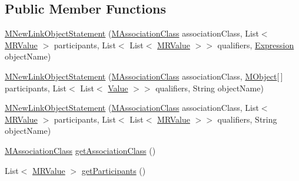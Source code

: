 \subsection*{Public Member Functions}
\begin{DoxyCompactItemize}
\item 
\hyperlink{classorg_1_1tzi_1_1use_1_1uml_1_1sys_1_1soil_1_1_m_new_link_object_statement_a0d26593ade840a62aec55f7de94e185e}{M\-New\-Link\-Object\-Statement} (\hyperlink{interfaceorg_1_1tzi_1_1use_1_1uml_1_1mm_1_1_m_association_class}{M\-Association\-Class} association\-Class, List$<$ \hyperlink{classorg_1_1tzi_1_1use_1_1uml_1_1sys_1_1soil_1_1_m_r_value}{M\-R\-Value} $>$ participants, List$<$ List$<$ \hyperlink{classorg_1_1tzi_1_1use_1_1uml_1_1sys_1_1soil_1_1_m_r_value}{M\-R\-Value} $>$$>$ qualifiers, \hyperlink{classorg_1_1tzi_1_1use_1_1uml_1_1ocl_1_1expr_1_1_expression}{Expression} object\-Name)
\item 
\hyperlink{classorg_1_1tzi_1_1use_1_1uml_1_1sys_1_1soil_1_1_m_new_link_object_statement_ab247cc575bdc80b9fc8e1a443c51d5c7}{M\-New\-Link\-Object\-Statement} (\hyperlink{interfaceorg_1_1tzi_1_1use_1_1uml_1_1mm_1_1_m_association_class}{M\-Association\-Class} association\-Class, \hyperlink{interfaceorg_1_1tzi_1_1use_1_1uml_1_1sys_1_1_m_object}{M\-Object}\mbox{[}$\,$\mbox{]} participants, List$<$ List$<$ \hyperlink{classorg_1_1tzi_1_1use_1_1uml_1_1ocl_1_1value_1_1_value}{Value} $>$$>$ qualifiers, String object\-Name)
\item 
\hyperlink{classorg_1_1tzi_1_1use_1_1uml_1_1sys_1_1soil_1_1_m_new_link_object_statement_a5bb6b98ba0089b52077ddb3b8aac15fc}{M\-New\-Link\-Object\-Statement} (\hyperlink{interfaceorg_1_1tzi_1_1use_1_1uml_1_1mm_1_1_m_association_class}{M\-Association\-Class} association\-Class, List$<$ \hyperlink{classorg_1_1tzi_1_1use_1_1uml_1_1sys_1_1soil_1_1_m_r_value}{M\-R\-Value} $>$ participants, List$<$ List$<$ \hyperlink{classorg_1_1tzi_1_1use_1_1uml_1_1sys_1_1soil_1_1_m_r_value}{M\-R\-Value} $>$$>$ qualifiers, String object\-Name)
\item 
\hyperlink{interfaceorg_1_1tzi_1_1use_1_1uml_1_1mm_1_1_m_association_class}{M\-Association\-Class} \hyperlink{classorg_1_1tzi_1_1use_1_1uml_1_1sys_1_1soil_1_1_m_new_link_object_statement_a7a4d214234de430b813c1eaa7704d90c}{get\-Association\-Class} ()
\item 
List$<$ \hyperlink{classorg_1_1tzi_1_1use_1_1uml_1_1sys_1_1soil_1_1_m_r_value}{M\-R\-Value} $>$ \hyperlink{classorg_1_1tzi_1_1use_1_1uml_1_1sys_1_1soil_1_1_m_new_link_object_statement_ae094f2d5e724d8a5c72715b6f0f166cb}{get\-Participants} ()
$$
\end{DoxyCompactItemize}
